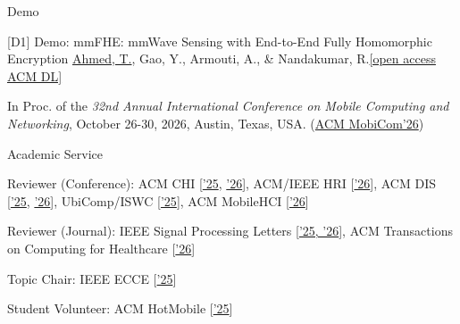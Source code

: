 \documentclass{resume} %
\begin{document}



\begin{rSection}{Demo}


\begin{rPublicationSubsection}{[D1] Demo: mmFHE: mmWave Sensing with End-to-End Fully Homomorphic Encryption}{}
{\underline{Ahmed, T.}, Gao, Y., Armouti, A., \& Nandakumar, R.}{\href{https://dl.acm.org/doi/10.1145/3795866.3848464}{[open access ACM DL]}}
\item In Proc. of the \textit{32nd Annual International Conference on Mobile Computing and Networking}, October 26-30, 2026, Austin, Texas, USA. (\href{https://www.sigmobile.org/mobicom/2026/}{ACM MobiCom'26}) \label{pub:D1}
 
\end{rPublicationSubsection}
\end{rSection}



\begin{rSection}{Academic Service}
\begin{rSubsection}{}{}{}{}
\item Reviewer (Conference): ACM CHI [\href{https://chi2025.acm.org/for-authors/case-studies/}{'25}, \href{https://chi2026.acm.org/}{'26}], ACM/IEEE HRI [\href{https://humanrobotinteraction.org/2026/}{'26}], ACM DIS [\href{https://dis.acm.org/2025/call-for-papers/}{'25}, \href{https://dis.acm.org/2026/papers/}{'26}], UbiComp/ISWC [\href{https://www.ubicomp.org/ubicomp-iswc-2025/iswc-notes-and-briefs/}{'25}], ACM MobileHCI [\href{https://mobilehci.acm.org/2026/submit/papers.html}{'26}]
\item Reviewer (Journal): IEEE Signal Processing Letters [\href{https://ieeexplore.ieee.org/xpl/RecentIssue.jsp?punumber=97}{'25, '26}], ACM Transactions on Computing for Healthcare [\href{https://www.webofscience.com/wos/author/record/OXB-5211-2025}{'26}]
\item Topic Chair: IEEE ECCE  [\href{https://www.ieee-ecce.org/2025/}{'25}]
\item Student Volunteer: ACM HotMobile [\href{https://hotmobile.org/2025/}{'25}]
\end{rSubsection}
\end{rSection}
\end{document}
